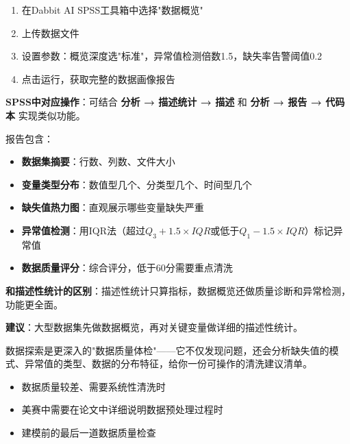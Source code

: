 \begin{algosposs}
\begin{enumerate}
    \item 在Dabbit AI SPSS工具箱中选择"数据概览"
    \item 上传数据文件
    \item 设置参数：概览深度选"标准"，异常值检测倍数1.5，缺失率告警阈值0.2
    \item 点击运行，获取完整的数据画像报告
\end{enumerate}

\textbf{SPSS中对应操作}：可结合 \textbf{分析 → 描述统计 → 描述} 和 \textbf{分析 → 报告 → 代码本} 实现类似功能。
\end{algosposs}

\begin{algoresult}
报告包含：
\begin{itemize}
    \item \textbf{数据集摘要}：行数、列数、文件大小
    \item \textbf{变量类型分布}：数值型几个、分类型几个、时间型几个
    \item \textbf{缺失值热力图}：直观展示哪些变量缺失严重
    \item \textbf{异常值检测}：用IQR法（超过$Q_3+1.5\times IQR$或低于$Q_1-1.5\times IQR$）标记异常值
    \item \textbf{数据质量评分}：综合评分，低于60分需要重点清洗
\end{itemize}
\end{algoresult}

\begin{algonotes}
\textbf{和描述性统计的区别}：描述性统计只算指标，数据概览还做质量诊断和异常检测，功能更全面。

\textbf{建议}：大型数据集先做数据概览，再对关键变量做详细的描述性统计。
\end{algonotes}


\begin{algointro}
数据探索是更深入的"数据质量体检"——它不仅发现问题，还会分析缺失值的模式、异常值的类型、数据的分布特征，给你一份可操作的清洗建议清单。
\end{algointro}

\begin{algoscene}
\begin{itemize}
    \item 数据质量较差、需要系统性清洗时
    \item 美赛中需要在论文中详细说明数据预处理过程时
    \item 建模前的最后一道数据质量检查
\end{itemize}
\end{algoscene}

